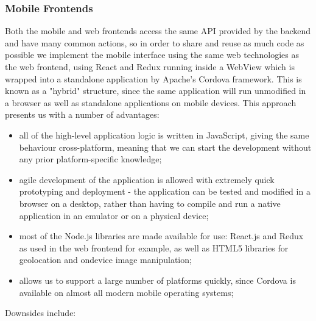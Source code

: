 \subsubsection{Mobile Frontends}

Both the mobile and web frontends access the same API provided by the backend and have many common actions, so in order to share and reuse as much code as possible we implement the mobile interface using the same web technologies as the web frontend, using React and Redux running inside a WebView which is wrapped into a standalone application by Apache's Cordova framework. This is known as a "hybrid" structure, since the same application will run unmodified in a browser as well as standalone applications on mobile devices. This approach presents us with a number of advantages:

\begin{itemize}
	\item all of the high-level application logic is written in JavaScript, giving the same behaviour cross-platform, meaning that we can start the development without any prior platform-specific knowledge;
	\item agile development of the application is allowed with extremely quick prototyping and deployment  - the application can be tested and modified in a browser on a desktop, rather than having to compile and run a native application in an emulator or on a physical device;
	\item most of the Node.js libraries are made available for use: React.js and Redux as used in the web frontend for example, as well as HTML5 libraries for geolocation and ondevice image manipulation;
	\item allows us to support a large number of platforms quickly, since Cordova is available on almost all modern mobile operating systems;
\end{itemize}

Downsides include:

